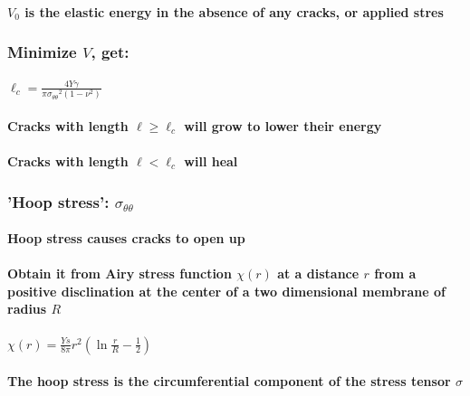 \documentclass{umthesis}
\begin{document}
\paragraph{$V_0$ is the elastic energy in the absence of any cracks, or applied stres}
\label{sec-2.1.5.2.10}
\subsubsection{Minimize $V$, get:}
\label{sec-2.1.5.3}
\paragraph{$\ell_c = \frac{ 4 Y \gamma}{\pi {\sigma_{\theta \theta}}^2 (1-\nu^2)}$}
\label{sec-2.1.5.3.1}
\paragraph{Cracks with length $\ell \ge \ell_c$ will grow to lower their energy}
\label{sec-2.1.5.3.2}
\paragraph{Cracks with length $\ell < \ell_c$ will heal}
\label{sec-2.1.5.3.3}
\subsubsection{'Hoop stress': $\sigma_{\theta \theta}$}
\label{sec-2.1.5.4}
\paragraph{Hoop stress causes cracks to open up}
\label{sec-2.1.5.4.1}
\paragraph{Obtain it from Airy stress function $\chi(r)$  \cite{seung} at a distance $r$ from a positive disclination at the center of a two dimensional membrane of radius $R$}
\label{sec-2.1.5.4.2}
\paragraph{$\chi(r) =  \frac{Y s}{8 \pi} r^2   \left ( \ln \frac{r}{R} - \frac{1}{2} \right )$}
\label{sec-2.1.5.4.3}
\paragraph{The hoop stress is the circumferential component of the stress tensor $\sigma$}
\label{sec-2.1.5.4.4}
\end{document}
